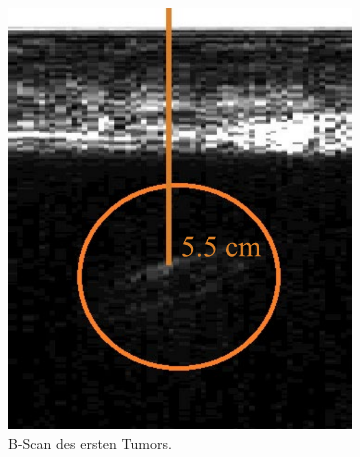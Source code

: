 \begin{figure}
  \centering
  \begin{subfigure}{0.4\textwidth}
      \includegraphics[width=\textwidth]{content/tumor1.pdf}
      \caption{B-Scan des ersten Tumors.}
      \label{fig:tumor1}
  \end{subfigure}
  \hfill
  \begin{subfigure}{0.4\textwidth}

\end{subfigure}
\end{figure}
